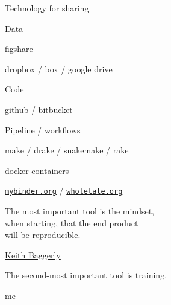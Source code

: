 \documentclass[aspectratio=169,12pt,t]{beamer}
\begin{document}
\begin{frame}[c]{Technology for sharing}

  \bbi
\item Data
  \bi
\item figshare
\item dropbox / box / google drive
  \ei
\item Code
  \bi
\item github / bitbucket
  \ei
\item Pipeline / workflows
  \bi
\item make / drake / snakemake / rake
\item docker containers
\item \href{https://mybinder.org}{\tt mybinder.org} /
  \href{https://wholetale.org}{\tt wholetale.org}
  \ei
  \ei

\note{
}

\end{frame}




\begin{frame}[c]{}

\begin{center}
\large
The most important tool is the {\hilit mindset},\\
when starting, that the end product \\
will be reproducible.
\end{center}

\hfill
{\lolit
{\textendash} \href{https://odin.mdacc.tmc.edu/~kabaggerly/}{Keith Baggerly}
}

\end{frame}




\begin{frame}[c]{}

\begin{center}
\large
The second-most important tool is {\hilit training}.
\end{center}

\vspace*{12mm}

\hfill
{\lolit
{\textendash} \href{https://kbroman.org}{me} \hspace*{20mm}
}

\note{
}
\end{frame}
\end{document}
